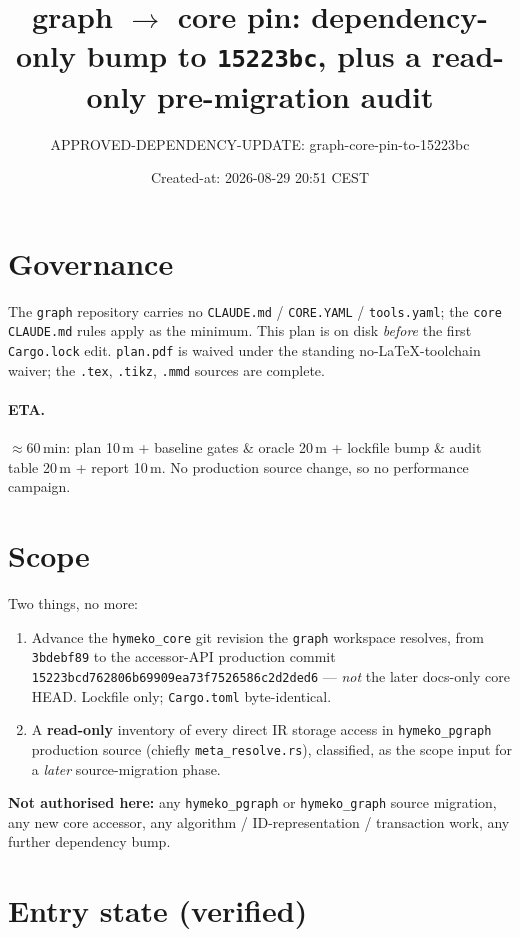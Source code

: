 \documentclass[11pt]{article}
\title{graph $\rightarrow$ core pin: dependency-only bump to \texttt{15223bc}, plus a read-only pre-migration audit}
\author{APPROVED-DEPENDENCY-UPDATE: graph-core-pin-to-15223bc}
\date{Created-at: 2026-08-29 20:51 CEST}
\begin{document}
\maketitle

\section*{Governance}

The \texttt{graph} repository carries no \texttt{CLAUDE.md} / \texttt{CORE.YAML}
/ \texttt{tools.yaml}; the \texttt{core} \texttt{CLAUDE.md} rules apply as the
minimum. This plan is on disk \emph{before} the first \texttt{Cargo.lock} edit.
\texttt{plan.pdf} is waived under the standing no-LaTeX-toolchain waiver; the
\texttt{.tex}, \texttt{.tikz}, \texttt{.mmd} sources are complete.

\paragraph{ETA.} $\approx$60\,min: plan 10\,m + baseline gates \& oracle 20\,m +
lockfile bump \& audit table 20\,m + report 10\,m. No production source change,
so no performance campaign.

\section{Scope}

Two things, no more:

\begin{enumerate}
\item Advance the \texttt{hymeko\_core} git revision the \texttt{graph} workspace
resolves, from \texttt{3bdebf89} to the accessor-API production commit
\texttt{15223bcd762806b69909ea73f7526586c2d2ded6} --- \emph{not} the later docs-only
core HEAD. Lockfile only; \texttt{Cargo.toml} byte-identical.
\item A \textbf{read-only} inventory of every direct IR storage access in
\texttt{hymeko\_pgraph} production source (chiefly \texttt{meta\_resolve.rs}),
classified, as the scope input for a \emph{later} source-migration phase.
\end{enumerate}

\textbf{Not authorised here:} any \texttt{hymeko\_pgraph} or \texttt{hymeko\_graph}
source migration, any new core accessor, any algorithm / ID-representation /
transaction work, any further dependency bump.

\section{Entry state (verified)}
\end{document}
